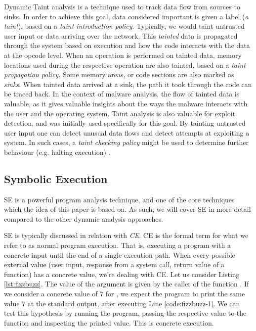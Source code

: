 Dynamic Taint analysis is a technique used to track data flow from sources to sinks. In order to achieve this goal, data considered important is given a label (\emph{a taint}), based on a \emph{taint introduction policy}. Typically, we would taint untrusted user input or data arriving over the network. This \emph{tainted} data is propagated through the system based on execution and how the code interacts with the data at the opcode level. When an operation is performed on tainted data, memory locations used during the respective operation are also tainted, based on a \emph{taint propagation policy}. Some memory areas, or code sections are also marked as \emph{sinks}. When tainted data arrived at a sink, the path it took through the code can be traced back. In the context of malware analysis, the flow of tainted data is valuable, as it gives valuable insights about the ways the malware interacts with the user and the operating system. Taint analysis is also valuable for exploit detection, and was initially used specifically for this goal. By tainting untrusted user input one can detect unusual data flows and detect attempts at exploiting a system. In such cases, a \emph{taint checking policy} might be used to determine further behaviour (e.g. halting execution) \cite{da_survey_2019} \cite{all_about_taint_2010}.

\subsection{Symbolic Execution}

\gls{SE} is a powerful program analysis technique, and one of the core techniques which the idea of this paper is based on. As such, we will cover \gls{SE} in more detail compared to the other dynamic analysis approaches.

\gls{SE} is typically discussed in relation with \emph{\gls{CE}}. \gls{CE} is the formal term for what we refer to as normal program execution. That is, executing a program with a concrete input until the end of a single execution path. When every possible external value (user input, response from a system call, return value of a function) has a concrete value, we're dealing with \gls{CE}.
Let us consider Listing \ref{lst:fizzbuzz}. The value of the argument  is given by the caller of the function . If we consider a concrete value of $7$ for , we expect the program to print the same value $7$ at the standard output, after executing Line \ref{code:fizzbuzz-1}. We can test this hypothesis by running the program, passing the respective value to the function and inspecting the printed value. This is concrete execution.

